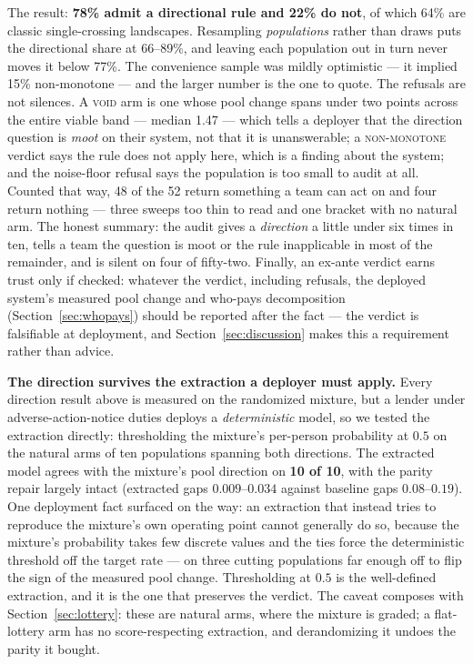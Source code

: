 \documentclass[9pt,conference]{IEEEtran}
\begin{document}
The result: \textbf{78\% admit a directional rule and 22\% do not}, of which 64\% are
classic single-crossing landscapes. Resampling \emph{populations} rather than draws puts the
directional share at 66--89\%, and leaving each population out in turn never moves it below
77\%. The convenience sample was mildly optimistic --- it implied 15\% non-monotone --- and
the larger number is the one to quote. The refusals are not
silences. A \textsc{void} arm is one whose pool change spans under two points across the
entire viable band --- median 1.47 --- which tells a deployer that the direction question is
\emph{moot} on their system, not that it is unanswerable; a \textsc{non-monotone} verdict
says the rule does not apply here, which is a finding about the system; and the noise-floor
refusal says the population is too small to audit at all. Counted that way, 48 of the 52
return something a team can act on and four return nothing --- three sweeps too thin to read
and one bracket with no natural arm. The honest summary: the audit gives a \emph{direction}
a little under six times in ten, tells a team the question is moot or the rule inapplicable
in most of the remainder, and is silent on four of fifty-two. Finally, an ex-ante verdict earns trust only if checked:
whatever the verdict, including refusals, the deployed system's measured pool change and
who-pays decomposition (Section~\ref{sec:whopays}) should be reported after the fact ---
the verdict is falsifiable at deployment, and Section~\ref{sec:discussion} makes this a
requirement rather than advice.

\textbf{The direction survives the extraction a deployer must apply.} Every direction
result above is measured on the randomized mixture, but a lender under
adverse-action-notice duties deploys a \emph{deterministic} model, so we tested the
extraction directly: thresholding the mixture's per-person probability at $0.5$ on the
natural arms of ten populations spanning both directions. The extracted model agrees
with the mixture's pool direction on \textbf{10 of 10}, with the parity repair largely
intact (extracted gaps $0.009$--$0.034$ against baseline gaps $0.08$--$0.19$). One
deployment fact surfaced on the way: an extraction that instead tries to reproduce the
mixture's own operating point cannot generally do so, because the mixture's probability
takes few discrete values and the ties force the deterministic threshold off the target
rate --- on three cutting populations far enough off to flip the sign of the measured
pool change. Thresholding at $0.5$ is the well-defined extraction, and it is the one
that preserves the verdict. The caveat composes with Section~\ref{sec:lottery}: these
are natural arms, where the mixture is graded; a flat-lottery arm has no
score-respecting extraction, and derandomizing it undoes the parity it bought.
\end{document}
